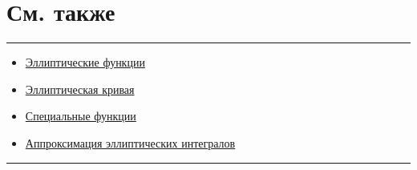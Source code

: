 \documentclass[fleqn]{article}
\begin{document}
	\section{См. также}
	\hrule
	\begin{itemize}
		\item \href{/wiki/%D0%AD%D0%BB%D0%BB%D0%B8%D0%BF%D1%82%D0%B8%D1%87%D0%B5%D1%81%D0%BA%D0%B8%D0%B5_%D1%84%D1%83%D0%BD%D0%BA%D1%86%D0%B8%D0%B8}{Эллиптические функции}
		\item \href{/wiki/%D0%AD%D0%BB%D0%BB%D0%B8%D0%BF%D1%82%D0%B8%D1%87%D0%B5%D1%81%D0%BA%D0%B0%D1%8F_%D0%BA%D1%80%D0%B8%D0%B2%D0%B0%D1%8F}{Эллиптическая кривая}
		\item \href{/wiki/%D0%A1%D0%BF%D0%B5%D1%86%D0%B8%D0%B0%D0%BB%D1%8C%D0%BD%D1%8B%D0%B5_%D1%84%D1%83%D0%BD%D0%BA%D1%86%D0%B8%D0%B8}{Специальные функции}
		\item \href{/wiki/%D0%90%D0%BF%D0%BF%D1%80%D0%BE%D0%BA%D1%81%D0%B8%D0%BC%D0%B0%D1%86%D0%B8%D0%B8_%D1%8D%D0%BB%D0%BB%D0%B8%D0%BF%D1%82%D0%B8%D1%87%D0%B5%D1%81%D0%BA%D0%B8%D1%85_%D0%B8%D0%BD%D1%82%D0%B5%D0%B3%D1%80%D0%B0%D0%BB%D0%BE%D0%B2}{Аппроксимация эллиптических интегралов}
	\end{itemize}
	
	\hrule
	
	
	
	
\end{document}
